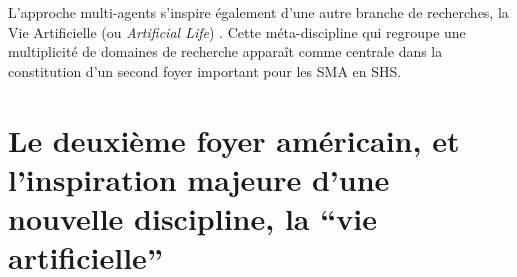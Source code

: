 L'approche multi-agents s'inspire également d'une autre branche de recherches, la Vie Artificielle (ou \textit{Artificial Life}) \autocite[28]{Ferber1995}. Cette méta-discipline qui regroupe une multiplicité de domaines de recherche apparaît comme centrale dans la constitution d'un second foyer important pour les SMA en SHS.






\section{Le deuxième foyer américain, et l'inspiration majeure d'une nouvelle discipline, la \enquote{vie artificielle}}

